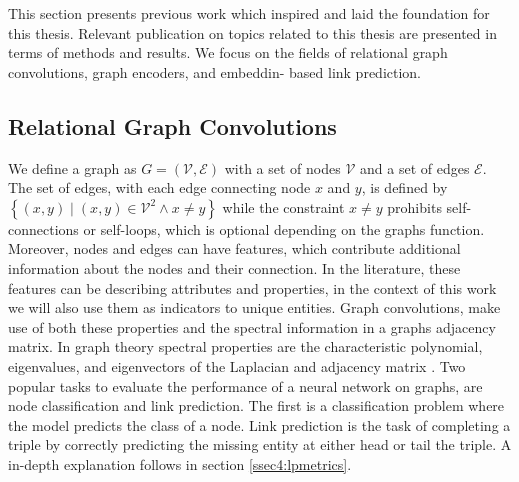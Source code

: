 This section presents previous work which inspired and laid the foundation for this thesis. Relevant publication on topics related to this thesis are presented in terms of methods and results. We focus on the fields of relational graph convolutions, graph encoders, and embeddin- based link prediction.

\subsection{Relational Graph Convolutions}
We define a graph as $G=(\mathcal{V}, \mathcal{E})$  with a set of nodes $\mathcal{V}$ and a set of edges $\mathcal{E}$. The set of edges, with each edge connecting node $x$ and $y$, is defined by $\left\{(x, y) \mid(x, y) \in \mathcal{V}^{2} \wedge x \neq y\right\}$ while the constraint $x \neq y$ prohibits self-connections or self-loops, which is optional depending on the graphs function. Moreover, nodes and edges can have features, which contribute additional information about the nodes and their connection. In the literature, these features can be describing attributes and properties, in the context of this work we will also use them as indicators to unique entities. Graph convolutions, make use of both these properties and the spectral information in a graphs adjacency matrix. In graph theory spectral properties are the characteristic polynomial, eigenvalues, and eigenvectors of the Laplacian and adjacency matrix \cite{chung1997spectral}. Two popular tasks to evaluate the performance of a neural network on graphs, are node classification and link prediction. The first is a classification problem where the model predicts the class of a node. Link prediction is the task of completing a triple by correctly predicting the missing entity at either head or tail the triple. A in-depth explanation follows in section \ref{ssec4:lpmetrics}.


